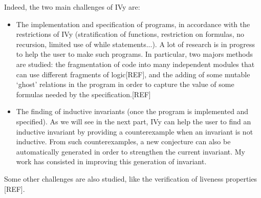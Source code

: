 \documentclass[11pt,a4paper,oldfontcommands]{memoir}
\begin{document}
    Indeed, the two main challenges of IVy are:
    \begin{itemize}
        \item The implementation and specification of programs, in accordance with the restrictions of IVy
        (stratification of functions, restriction on formulas, no recursion, limited use of while statements...).
        A lot of research is in progress to help the user to make such programs. In particular, two majors methods are
        studied: the fragmentation of code into many independent modules that can use different fragments of logic[REF],
        and the adding of some mutable `ghost' relations in the program in order to capture the value of some formulas needed by the specification.[REF]
        
        \item The finding of inductive invariants (once the program is implemented and specified). As we will see in the next part,
        IVy can help the user to find an inductive invariant by providing a counterexample when an invariant is not inductive.
        From such counterexamples, a new conjecture can also be automatically generated in order to strengthen the current invariant.
        My work has consisted in improving this generation of invariant.
    \end{itemize}

    Some other challenges are also studied, like the verification of liveness properties [REF].

\end{document}
